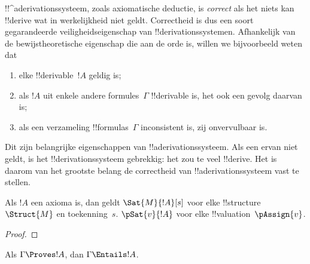 \documentclass[../../../include/open-logic-section]{subfiles}
\begin{document}
      {}
      {}
      

\begin{explain}
!!^a{derivation}ssysteem, zoals axiomatische deductie, is \emph{correct}
als het niets kan !!{derive} wat in werkelijkheid niet geldt.
Correctheid is dus een soort gegarandeerde veiligheidseigenschap van
!!{derivation}ssystemen. Afhankelijk van de bewijstheoretische
eigenschap die aan de orde is, willen we bijvoorbeeld weten dat
\begin{enumerate}
\item elke !!{derivable}~$!A$ geldig is;
\item als $!A$ uit enkele andere formules~$\Gamma$ !!{derivable} is,
  het ook een gevolg daarvan is;
\item als een verzameling !!{formula}s~$\Gamma$ inconsistent is, zij
  onvervulbaar is.
\end{enumerate}
Dit zijn belangrijke eigenschappen van !!a{derivation}ssysteem. Als
een ervan niet geldt, is het !!{derivation}ssysteem gebrekkig: het zou
te veel !!{derive}. Het is daarom van het grootste belang de
correctheid van !!a{derivation}ssysteem vast te stellen.
\end{explain}

\begin{prop}
  Als $!A$ een axioma is, dan geldt
    {$\Sat{M}{!A}[s]$ voor elke !!{structure}~$\Struct{M}$ en toekenning~$s$.}
    {$\pSat{v}{!A}$ voor elke !!{valuation}~$\pAssign{v}$.}
\end{prop}

\begin{proof}
\end{proof}

\begin{thm}[Correctheid]
Als $\Gamma \Proves !A$, dan $\Gamma \Entails !A$.
\end{thm}
\end{document}
